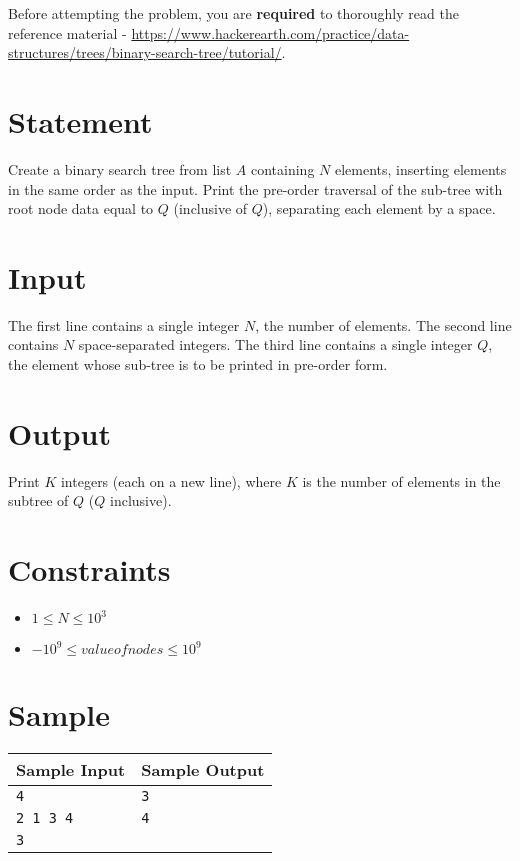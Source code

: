 \documentclass{article}
\begin{document}
Before attempting the problem, you are \textbf{required} to thoroughly read the reference material - \url{https://www.hackerearth.com/practice/data-structures/trees/binary-search-tree/tutorial/}.

\section*{Statement}

Create a binary search tree from list $A$ containing $N$ elements, inserting elements in the same order as the input. Print the pre-order traversal of the sub-tree with root node data equal to $Q$ (inclusive of $Q$), separating each element by a space.

\section*{Input}

The first line contains a single integer $N$, the number of elements. The second line contains $N$ space-separated integers. The third line contains a single integer $Q$, the element whose sub-tree is to be printed in pre-order form. 

\section*{Output}

Print $K$ integers (each on a new line), where $K$ is the number of elements in the subtree of $Q$ ($Q$ inclusive).

\section*{Constraints}

\begin{itemize}
    \item $1 \le N \le 10^{3}$
    \item $-10^{9} \le valueofnodes \le 10^{9}$
\end{itemize}

\section*{Sample}

\begin{tabular}{l|l}
    \hline
    \hline
    Sample Input & Sample Output \\
    \hline
    \verb+4+ & \verb+3+ \\
    \verb+2 1 3 4+ & \verb+4+ \\
    \verb+3+ & \verb++ \\
    \hline
\end{tabular}
\end{document}
